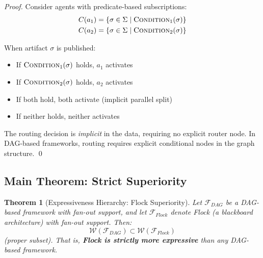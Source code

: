 \documentclass[11pt]{article}
\newtheorem{theorem}{Theorem}
\begin{document}
\begin{proof}
Consider agents with predicate-based subscriptions:
\begin{align*}
C(a_1) &= \{\sigma \in \Sigma \mid \textsc{Condition}_1(\sigma)\} \\
C(a_2) &= \{\sigma \in \Sigma \mid \textsc{Condition}_2(\sigma)\}
\end{align*}

When artifact $\sigma$ is published:
\begin{itemize}
    \item If $\textsc{Condition}_1(\sigma)$ holds, $a_1$ activates
    \item If $\textsc{Condition}_2(\sigma)$ holds, $a_2$ activates
    \item If both hold, both activate (implicit parallel split)
    \item If neither holds, neither activates
\end{itemize}

The routing decision is \emph{implicit} in the data, requiring no explicit router node. In DAG-based frameworks, routing requires explicit conditional nodes in the graph structure. \qed
\end{proof}

\subsection{Main Theorem: Strict Superiority}

\begin{theorem}[Expressiveness Hierarchy: Flock Superiority]
\label{thm:main}
Let $\mathcal{F}_{DAG}$ be a DAG-based framework with fan-out support, and let $\mathcal{F}_{Flock}$ denote Flock (a blackboard architecture) with fan-out support. Then:
\[\mathcal{W}(\mathcal{F}_{DAG}) \subset \mathcal{W}(\mathcal{F}_{Flock})\]
(proper subset). That is, \textbf{Flock is strictly more expressive} than any DAG-based framework.
\end{theorem}
\end{document}
